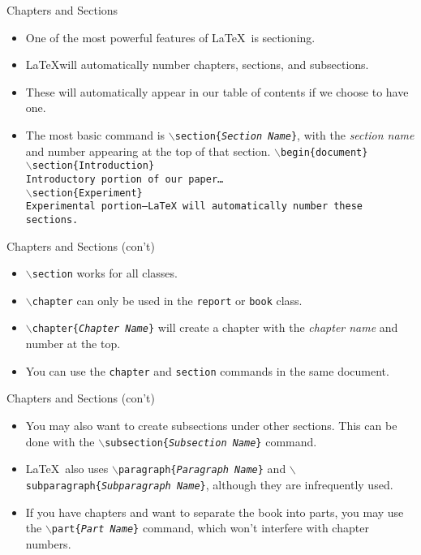 \documentclass[pdf]{prosper}
\begin{document}
\begin{slide}{Chapters and Sections}
	\begin{itemize}
		\item One of the most powerful features of \LaTeX\ is sectioning.
		\item \LaTeX will automatically number chapters, sections, and subsections.
		\item These will automatically appear in our table of contents if we choose to have one.
		\item The most basic command is \texttt{$\backslash$section\{\textit{Section Name}\}}, with the \textit{section name} and number appearing at the top of that section.
			\texttt{$\backslash$begin\{document\}} \\
			\texttt{$\backslash$section\{Introduction\}} \\
			\texttt{Introductory portion of our paper\ldots} \\
			\texttt{$\backslash$section\{Experiment\}} \\
			\texttt{Experimental portion---\LaTeX\ will automatically number these sections.} \\
	\end{itemize}
\end{slide}
\begin{slide}{Chapters and Sections (con't)}
	\begin{itemize}
		\item \texttt{$\backslash$section} works for all classes.
		\item \texttt{$\backslash$chapter} can only be used in the \texttt{report} or \texttt{book} class.
		\item \texttt{$\backslash$chapter\{\textit{Chapter Name}\}} will create a chapter with the \textit{chapter name} and number at the top.
		\item You can use the \texttt{chapter} and \texttt{section} commands in the same document.
	\end{itemize}
\end{slide}
\begin{slide}{Chapters and Sections (con't)}
	\begin{itemize}
		\item You may also want to create subsections under other sections. This can be done with the \texttt{$\backslash$subsection\{\textit{Subsection Name}\}} command.
		\item \LaTeX\ also uses \texttt{$\backslash$paragraph\{\textit{Paragraph Name}\}} and \texttt{$\backslash$subparagraph\{\textit{Subparagraph Name}\}}, although they are infrequently used.
		\item If you have chapters and want to separate the book into parts, you may use the \texttt{$\backslash$part\{\textit{Part Name}\}} command, which won't interfere with chapter numbers.
	\end{itemize}
\end{slide}
\end{document}
